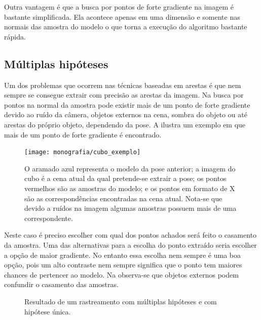 Outra vantagem é que a busca por pontos de forte gradiente na imagem é bastante simplificada. Ela acontece apenas em uma dimensão e somente nas normais das amostra do modelo o que torna a execução do algoritmo bastante rápida.

\subsection{Múltiplas hipóteses}

Um dos problemas que ocorrem nas técnicas baseadas em arestas é que nem sempre se consegue extrair com precisão as arestas da imagem. Na busca por pontos na normal da amostra pode existir mais de um ponto de forte gradiente devido ao ruído da câmera, objetos externos na cena, sombra do objeto ou até arestas do próprio objeto, dependendo da pose. A  ilustra um exemplo em que mais de um ponto de forte gradiente é encontrado.

\begin{figure}[ht!]
\centering
\texttt{[image: monografia/cubo\_exemplo]}
\caption{O aramado azul representa o modelo da pose anterior; a imagem do cubo é a cena atual da qual pretende-se extrair a pose; os pontos vermelhos são as amostras do modelo; e os pontos em formato de X são as correspondências encontradas na cena atual. Nota-se que devido a ruídos na imagem algumas amostras possuem mais de uma correspondente.}
\label{cubo_0}
\end{figure}

Neste caso é preciso escolher com qual dos pontos achados será feito o casamento da amostra. Uma das alternativas para a escolha do ponto extraído seria escolher a opção de maior gradiente. No entanto essa escolha nem sempre é uma boa opção, pois um alto contraste nem sempre significa que o ponto tem maiores chances de pertencer ao modelo. Na  observa-se que objetos externos podem confundir o casamento das amostras.

\begin{figure}[!ht]
	\centerline{
		\hfil
	}
	\caption{Resultado de um rastreamento com múltiplas hipóteses e com hipótese única.}
\end{figure}

